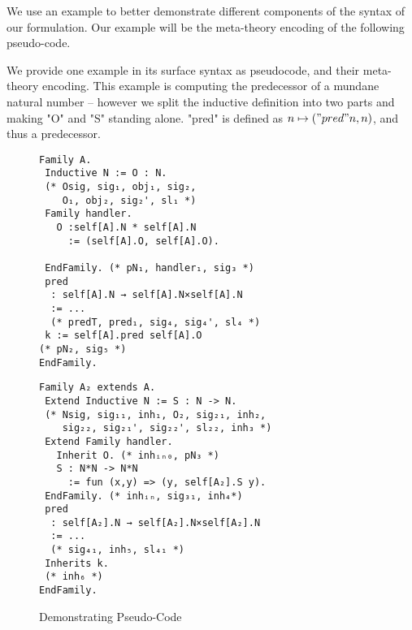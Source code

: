 We use an example to better demonstrate different components of the syntax of our formulation. Our example will be the meta-theory encoding of the following pseudo-code.

We provide one example in its surface syntax as pseudocode, and their meta-theory encoding. This example is computing the predecessor of a mundane natural number -- however we split the inductive definition into two parts and making "O" and "S" standing alone. "pred" is defined as $n \mapsto ("pred" n, n)$, and thus a predecessor.




\begin{figure}[H]\label{fig:example-pseudocode}
\begin{minipage}[t]{0.5\linewidth}
\begin{verbatim}
Family A.
 Inductive N := O : N. 
 (* Osig, sig₁, obj₁, sig₂,
    O₁, obj₂, sig₂', sl₁ *)
 Family handler.
   O :self[A].N * self[A].N 
     := (self[A].O, self[A].O). 

 EndFamily. (* pN₁, handler₁, sig₃ *)
 pred 
  : self[A].N → self[A].N×self[A].N 
  := ... 
  (* predT, pred₁, sig₄, sig₄', sl₄ *) 
 k := self[A].pred self[A].O 
(* pN₂, sig₅ *)
EndFamily.
\end{verbatim}
  \end{minipage}
  \begin{minipage}[t]{0.45\linewidth}
\begin{verbatim}
Family A₂ extends A.
 Extend Inductive N := S : N -> N.
 (* Nsig, sig₁₁, inh₁, O₂, sig₂₁, inh₂, 
    sig₂₂, sig₂₁', sig₂₂', sl₂₂, inh₃ *)
 Extend Family handler.
   Inherit O. (* inhᵢₙ₀, pN₃ *)
   S : N*N -> N*N 
     := fun (x,y) => (y, self[A₂].S y).
 EndFamily. (* inhᵢₙ, sig₃₁, inh₄*)
 pred 
  : self[A₂].N → self[A₂].N×self[A₂].N 
  := ... 
  (* sig₄₁, inh₅, sl₄₁ *)
 Inherits k. 
 (* inh₆ *)
EndFamily.
    \end{verbatim}
  \end{minipage}
  \caption{Demonstrating Pseudo-Code}
\end{figure}

